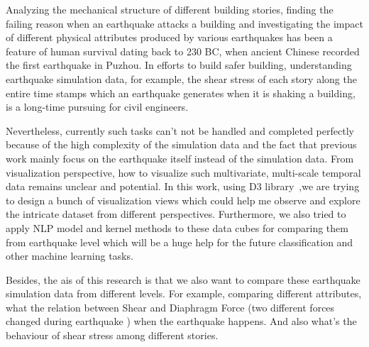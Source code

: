 Analyzing the mechanical structure of different building stories, finding the failing reason when an earthquake attacks a building and investigating the impact of different physical attributes produced by various earthquakes has been a feature of human survival dating back to 230 BC, when ancient Chinese recorded the first earthquake in Puzhou. In efforts to build safer building, understanding earthquake simulation data, for example, the shear stress of each story along the entire time stamps which an earthquake generates when it is shaking a building, is a long-time pursuing for civil engineers. 

Nevertheless, currently such tasks can't not be handled and completed perfectly because of the high complexity of the simulation data and the fact that previous work mainly focus on the earthquake itself instead of the simulation data. From visualization perspective, how to visualize such multivariate, multi-scale temporal data remains unclear and potential. In this work, using D3 library~\cite{Bostock:2011:DDD:2068462.2068631},we are trying to design a bunch of visualization views which could help me observe and explore the intricate dataset from different perspectives. Furthermore, we also tried to apply NLP model and kernel methods to these data cubes for comparing them from earthquake level which will be a huge help for the future classification and other machine learning tasks.

Besides, the ais of this research is that we also want to compare these earthquake simulation data from different levels. For example, comparing different attributes, what the relation between Shear and Diaphragm Force (two different forces changed during earthquake ) when the earthquake happens. And also what's the behaviour of shear stress among different stories.


